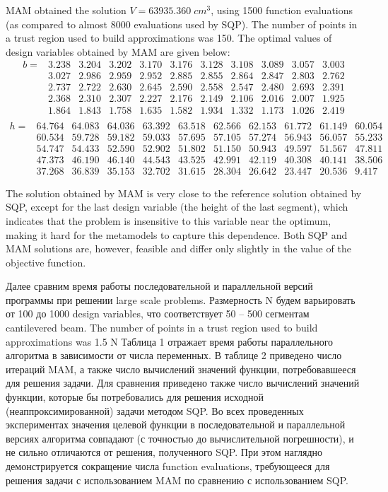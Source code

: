 \documentclass[runningheads,a4paper]{llncs}
\begin{document}
MAM obtained the solution $V = 63935.360\; cm^3$, using 1500 function evaluations (as compared to almost 8000 evaluations used by SQP). The number of points in a trust region used to build approximations was 150. The optimal values of design variables obtained by MAM are given below:
\[
\begin{matrix}
	b=&	3.238&3.204&3.202&3.170&3.176&3.128&3.108&3.089&3.057&3.003 \\  
		& 3.027&2.986&2.959&2.952&2.885&2.855&2.864&2.847&2.803&2.762 \\  
		& 2.737&2.722&2.630&2.645&2.590&2.558&2.547&2.480&2.693&2.391 \\ 
		& 2.368&2.310&2.307&2.227&2.176&2.149&2.106&2.016&2.007&1.925 \\  
		& 1.864&1.843&1.758&1.635&1.582&1.934&1.332&1.173&1.026&2.419 \\ 
\end{matrix}
\]
\[
\begin{matrix}
	h=& 64.764&64.083&64.036&63.392&63.518&62.566&62.153&61.772&61.149& 60.054  \\
		& 60.534&59.728&59.182&59.033&57.695&57.105&57.274&56.943&56.057&55.233  \\
		& 54.747&54.433&52.590&52.902&51.802&51.150&50.943&49.597&51.567&47.811  \\
		& 47.373&46.190&46.140&44.543&43.525&42.991&42.119&40.308&40.141&38.506  \\
		& 37.268&36.839&35.153&32.702&31.615&28.304&26.642&23.447&20.536& 9.417

\end{matrix}
\]

The solution obtained by MAM is very close to the reference solution obtained by SQP, except for the last design variable (the height of the last segment), which indicates that the problem is insensitive to this variable near the optimum, making it hard for the metamodels to capture this dependence. Both SQP and MAM solutions are, however, feasible and differ only slightly in the value of the objective function.

\Russian
Далее сравним время работы последовательной и параллельной версий программы при решении large scale problems. Размерность N будем варьировать от 100 до 1000 design variables, что соответствует 50 – 500 сегментам cantilevered beam. The number of points in a trust region used to build approximations was 1.5 N  Таблица 1 отражает время работы параллельного алгоритма в зависимости от числа переменных. В таблице 2 приведено число итераций MAM, а также число вычислений значений функции, потребовавшееся для решения задачи. Для сравнения приведено также число вычислений значений функции, которые бы потребовались для решения исходной (неаппроксимированной) задачи методом SQP. Во всех проведенных экспериментах значения целевой функции в последовательной и параллельной версиях алгоритма совпадают (с точностью до вычислительной погрешности), и не сильно отличаются от решения, полученного SQP. При этом наглядно демонстрируется сокращение числа function evaluations, требующееся для решения задачи с использованием MAM по сравнению с использованием SQP.
\end{document}
